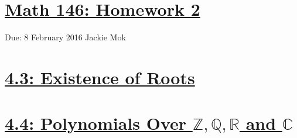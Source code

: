 \documentclass{article}
\begin{document}
\section*{\underline{Math 146: Homework 2}}
Due: 8 February 2016
\newline Jackie Mok

\vspace{10 mm}

\section*{\underline{4.3: Existence of Roots}}







\vspace{5 mm}

\section*{\underline{4.4: Polynomials Over $\mathbb{Z,Q,R}$ and $\mathbb{C}$}}





\end{document}
